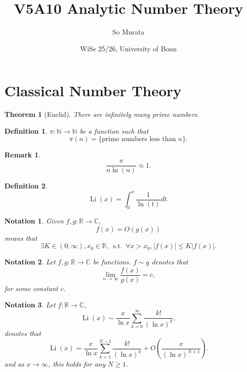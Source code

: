 \documentclass{article}
\title{V5A10 Analytic Number Theory}
\author{So Murata}
\date{WiSe 25/26, University of Bonn}
\newtheorem{theorem}{Theorem} [section]
\newtheorem{definition}{Definition}[section]
\newtheorem{notation}{Notation}[section]
\newtheorem{remark}{Remark}[section]
\DeclareMathOperator{\straw}{s.t.}
\DeclareMathOperator{\Li}{Li}
\newcommand{\N}[0]{\mathbb{N}}
\newcommand{\R}[0]{\mathbb{R}}
\newcommand{\C}[0]{\mathbb{C}}
\newcommand{\st}[0]{\:\straw\:}
\begin{document}
\maketitle
\section{Classical Number Theory}
\begin{theorem}[Euclid]
There are infinitely many prime numbers.
\end{theorem}

\begin{definition}
$\pi:\N\to\N$ be a function such that 
\begin{equation*}
\pi(n) =\{\text{prime numbers less than $n$}\}.
\end{equation*}
\end{definition}

\begin{remark}
\begin{equation*}
{\frac {\pi} {n\ln(n)}} \approx 1.
\end{equation*}
\end{remark}

\begin{definition}
\begin{equation*}
\Li(x) = \int_0^x {\frac 1 {\ln(t)}}dt.
\end{equation*}
\end{definition}

\begin{notation}
  Given $f,g:\R\to \C$, 
  \begin{equation*}
    f(x) = O(g(x))
  \end{equation*}
  means that 
  \begin{equation*}
    \exists K\in(0,\infty),x_0\in\R, \st \forall x>x_0, \vert f(x)\vert\leq K\vert f(x)\vert.
  \end{equation*}
\end{notation}

\begin{notation}
  Let $f,g:\R\to\C$ be functions. $f\sim g$ denotes that 
  \begin{equation*}
    \lim_{n\to\infty}{\frac {f(x)} {g(x)}}=c,
  \end{equation*}
  for some constant $c$.
\end{notation}

\begin{notation}
  Let $f:\R\to\C$, 
  \begin{equation*}
    \Li(x)\sim{\frac x {\ln x}}\sum_{k=0}^\infty {\frac {k!} {(\ln x)^k}},
  \end{equation*}
  denotes that 
  \begin{equation*}
    \Li(x) = {\frac x {\ln x}}\sum_{k=1}^{N-1}{\frac {k!} {(\ln x)^k}}+O\left({\frac {x} {(\ln x)^{N+1}}}\right).
  \end{equation*}
  and as $x\to\infty$, this holds for any $N\geq1$. 
\end{notation}
\end{document}

